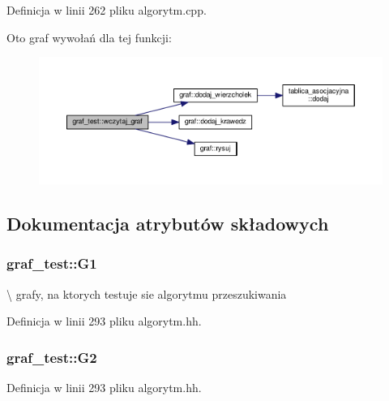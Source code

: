 Definicja w linii 262 pliku algorytm.\-cpp.



Oto graf wywołań dla tej funkcji\-:
\nopagebreak
\begin{figure}[H]
\begin{center}
\leavevmode
\includegraphics[width=350pt]{classgraf__test_aeff6fe08c72fe45a15bd7b41028acc7c_cgraph}
\end{center}
\end{figure}




\subsection{Dokumentacja atrybutów składowych}
\hypertarget{classgraf__test_ad381752b1793a26f024d7083acc686b7}{
\subsubsection[{G1}]{ graf\-\_\-test\-::\-G1\hspace{0.3cm}{\ttfamily [private]}}}\label{classgraf__test_ad381752b1793a26f024d7083acc686b7}
\textbackslash{} grafy, na ktorych testuje sie algorytmu przeszukiwania 

Definicja w linii 293 pliku algorytm.\-hh.

\hypertarget{classgraf__test_a2da908ecaa7b052598d842ffd6c366a9}{
\subsubsection[{G2}]{ graf\-\_\-test\-::\-G2\hspace{0.3cm}{\ttfamily [private]}}}\label{classgraf__test_a2da908ecaa7b052598d842ffd6c366a9}


Definicja w linii 293 pliku algorytm.\-hh.

